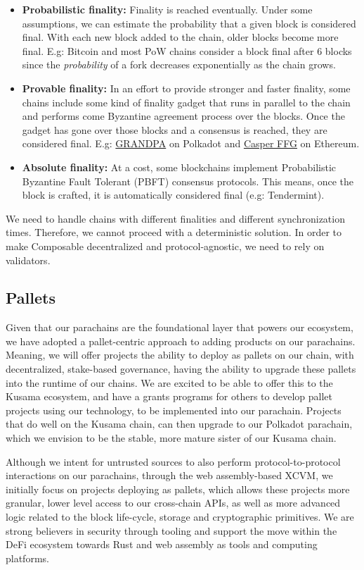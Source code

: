\begin{itemize}
    \item \textbf{Probabilistic finality:} Finality is reached eventually. Under some assumptions, we can estimate the probability that a given block is considered final. With each new block added to the chain, older blocks become more final. E.g: Bitcoin and most PoW chains consider a block final after 6 blocks since the \textit{probability} of a fork decreases exponentially as the chain grows.
    
    \item \textbf{Provable finality:} In an effort to provide stronger and faster finality, some chains include some kind of finality gadget that runs in parallel to the  chain and performs come Byzantine agreement process over the blocks. Once the gadget has gone over those blocks and a consensus is reached, they are considered final. E.g: \href{https://github.com/w3f/consensus/blob/master/pdf/grandpa.pdf}{GRANDPA} on Polkadot and \href{https://arxiv.org/pdf/1710.09437.pdf}{Casper FFG} on Ethereum.
    
    \item \textbf{Absolute finality:} At a cost, some blockchains implement Probabilistic Byzantine Fault Tolerant (PBFT) consensus protocols. This means, once the block is crafted, it is automatically considered final (e.g: Tendermint).
\end{itemize}

We need to handle chains with different finalities and different synchronization times. Therefore, we cannot proceed with a deterministic solution. In order to make Composable decentralized and protocol-agnostic, we need to rely on validators.

\subsection{Pallets}
Given that our parachains are the foundational layer that powers our ecosystem, we have adopted a pallet-centric approach to adding products on our parachains. Meaning, we will offer projects the ability to deploy as pallets on our chain, with decentralized, stake-based governance, having the ability to upgrade these pallets into the runtime of our chains. We are excited to be able to offer this to the Kusama ecosystem, and have a grants programs for others to develop pallet projects using our technology, to be implemented into our parachain. Projects that do well on the Kusama chain, can then upgrade to our Polkadot parachain, which we envision to be the stable, more mature sister of our Kusama chain. 

Although we intent for untrusted sources to also perform protocol-to-protocol interactions on our parachains, through the web assembly-based XCVM, we initially focus on projects deploying as pallets, which allows these projects more granular, lower level access to our cross-chain APIs, as well as more advanced logic related to the block life-cycle, storage and cryptographic primitives. We are strong believers in security through tooling and support the move within the DeFi ecosystem towards Rust and web assembly as tools and computing platforms.